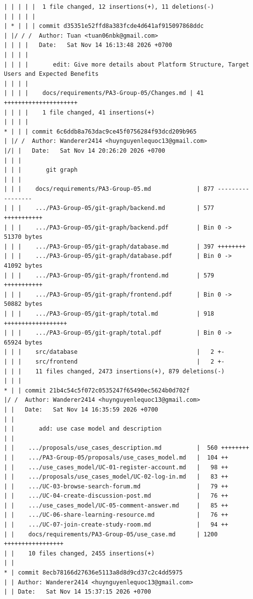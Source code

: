 \documentclass[12pt]{article}
\begin{document}
\begin{lstlisting}[numbers=none,breaklines=true]
| | | | |  1 file changed, 12 insertions(+), 11 deletions(-)
| | | | |
| * | | | commit d35351e52ffd8a383fcde4d641af915097868ddc
| |/ / /  Author: Tuan <tuan06nbk@gmail.com>
| | | |   Date:   Sat Nov 14 16:13:48 2026 +0700
| | | |
| | | |       edit: Give more details about Platform Structure, Target Users and Expected Benefits
| | | |
| | | |    docs/requirements/PA3-Group-05/Changes.md | 41 +++++++++++++++++++++
| | | |    1 file changed, 41 insertions(+)
| | | |
* | | | commit 6c6ddb8a763dac9ce45f0756284f93dcd209b965
| |/ /  Author: Wanderer2414 <huynguyenlequoc13@gmail.com>
|/| |   Date:   Sat Nov 14 20:26:20 2026 +0700
| | |
| | |       git graph
| | |
| | |    docs/requirements/PA3-Group-05.md             | 877 -----------------
| | |    .../PA3-Group-05/git-graph/backend.md         | 577 +++++++++++
| | |    .../PA3-Group-05/git-graph/backend.pdf        | Bin 0 -> 51370 bytes
| | |    .../PA3-Group-05/git-graph/database.md        | 397 ++++++++
| | |    .../PA3-Group-05/git-graph/database.pdf       | Bin 0 -> 41092 bytes
| | |    .../PA3-Group-05/git-graph/frontend.md        | 579 +++++++++++
| | |    .../PA3-Group-05/git-graph/frontend.pdf       | Bin 0 -> 50882 bytes
| | |    .../PA3-Group-05/git-graph/total.md           | 918 ++++++++++++++++++
| | |    .../PA3-Group-05/git-graph/total.pdf          | Bin 0 -> 65924 bytes
| | |    src/database                                  |   2 +-
| | |    src/frontend                                  |   2 +-
| | |    11 files changed, 2473 insertions(+), 879 deletions(-)
| | |
* | | commit 21b4c54c5f072c0535247f65490ec5624b0d702f
|/ /  Author: Wanderer2414 <huynguyenlequoc13@gmail.com>
| |   Date:   Sat Nov 14 16:35:59 2026 +0700
| |
| |       add: use case model and description
| |
| |    .../proposals/use_cases_description.md          |  560 ++++++++
| |    .../PA3-Group-05/proposals/use_cases_model.md   |  104 ++
| |    .../use_cases_model/UC-01-register-account.md   |   98 ++
| |    .../proposals/use_cases_model/UC-02-log-in.md   |   83 ++
| |    .../UC-03-browse-search-forum.md                |   79 ++
| |    .../UC-04-create-discussion-post.md             |   76 ++
| |    .../use_cases_model/UC-05-comment-answer.md     |   85 ++
| |    .../UC-06-share-learning-resource.md            |   76 ++
| |    .../UC-07-join-create-study-room.md             |   94 ++
| |    docs/requirements/PA3-Group-05/use_case.md      | 1200 +++++++++++++++++
| |    10 files changed, 2455 insertions(+)
| |
* | commit 8ecb78166d27636e5113a8d8d9cd37c2c4dd5975
| | Author: Wanderer2414 <huynguyenlequoc13@gmail.com>
| | Date:   Sat Nov 14 15:37:15 2026 +0700

\end{lstlisting}
\end{document}
